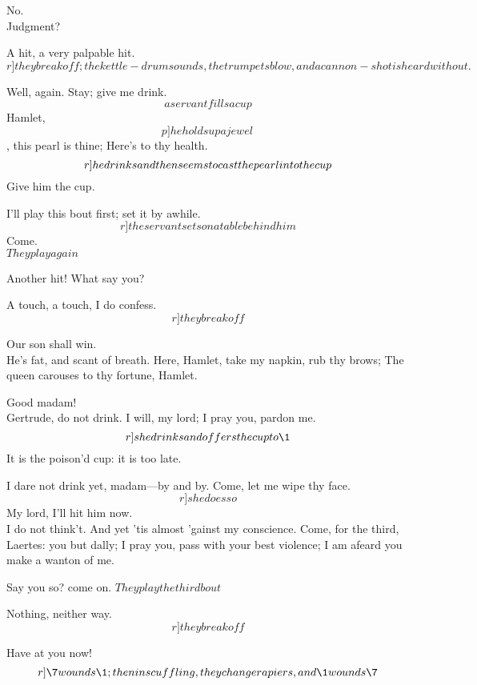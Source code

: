 \documentclass[11pt]{book}
\begin{document}
\7	No. \\

\1	Judgment?

 A hit, a very palpable hit. \\

\[r]they break off; the  kettle-drum sounds, the trumpets blow,
   and a cannon-shot is heard without.\]


\7	       Well, again.
\2	Stay; give me drink. \[a servant fills a cup\]
   Hamlet, \[p]he holds up a jewel\,\], this pearl is thine;
	Here's to thy health. \\\[r]he drinks and then seems to cast\\ 
                            the pearl into the cup\]
	Give him the cup.

\1	I'll play this bout first; set it by awhile.
   \[r]the servant sets on a table behind him\]
   Come. \\

	\(They play again\)

	 Another hit! What say you?

\7	A touch, a touch, I do confess. \[r]they break off\]

\2	Our son shall win.  \\

\3   He's fat, and scant of breath.
	Here, Hamlet, take my napkin, rub thy brows;
	The queen carouses to thy fortune, Hamlet.

\1	Good madam! \\
\2	 Gertrude, do not drink.
\3	I will, my lord; I pray you, pardon me.
   \[r]she drinks and offers the cup to \1\]
\aparte\2 It is the poison'd cup: it is too late.

\1	I dare not drink yet, madam---by and by.
\3	Come, let me wipe thy face. \[r]she does so\]
\7	My lord, I'll hit him now. \\
\2	I do not think't.
\aparte\7	 And yet 'tis almost 'gainst my conscience.
\1	Come, for the third, Laertes: you but dally;
	I pray you, pass with your best violence;
	I am afeard you make a wanton of me.

\7	Say you so? come on.
	\(They play the third bout\)

	Nothing, neither way. \[r]they break off\] 

\7	Have at you now! \\

\[r]\7 wounds \1; then in scuffling, they\\ change rapiers, and \1 wounds \7\]
\end{document}
